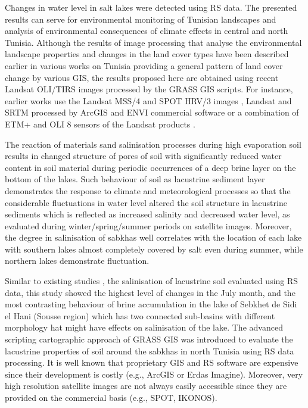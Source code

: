 \documentclass[land,article,submit,pdftex,moreauthors]{Definitions/mdpi}
\begin{document}
Changes in water level in salt lakes were detected using RS data. The presented results can serve for environmental monitoring of Tunisian landscapes and analysis of environmental consequences of climate effects in central and north Tunisia. Although the results of image processing that analyse the environmental landscape properties and changes in the land cover types have been described earlier in various works on Tunisia \cite{Touhami,Khelifa,Hammami,Bounouh} providing a general pattern of land cover change by various GIS, the results proposed here are obtained using recent Landsat OLI/TIRS images processed by the GRASS GIS scripts. For instance, earlier works use the Landsat MSS/4 and SPOT HRV/3 images \cite{Park}, Landsat and SRTM processed by ArcGIS and ENVI commercial software \cite{Souissi,Afrasinei} or a combination of ETM+ and OLI 8 sensors of the Landsat products \cite{Mezned}. 

The reaction of materials sand salinisation processes during high evaporation soil results in changed structure of pores of soil with significantly reduced water content in soil material during periodic occurrences of a deep brine layer on the bottom of the lakes. Such behaviour of soil as lacustrine sediment layer demonstrates the response to climate and meteorological processes so that the considerable fluctuations in water level altered the soil structure in lacustrine sediments which is reflected as increased salinity and decreased water level, as evaluated during winter/spring/summer periods on satellite images. Moreover, the degree in salinisation of sabkhas well correlates with the location of each lake with southern lakes almost completely covered by salt even during summer, while northern lakes demonstrate fluctuation. 

Similar to existing studies \cite{BAYATI2021126032,SHENG2016129,SCHRODER20221710}, the salinisation of lacustrine soil evaluated using RS data, this study showed the highest level of changes in the July month, and the most contrasting behaviour of brine accumulation in the lake of Sebkhet de Sidi el Hani (Sousse region) which has two connected sub-basins with different morphology hat might have effects on salinisation of the lake. The advanced scripting cartographic approach of GRASS GIS was introduced to evaluate the lacustrine properties of soil around the sabkhas in north Tunisia using RS data processing. It is well known that proprietary GIS and RS software are expensive since their development is costly (e.g., ArcGIS or Erdas Imagine). Moreover, very high resolution satellite images are not always easily accessible since they are provided on the commercial basis (e.g., SPOT, IKONOS). 
\end{document}

